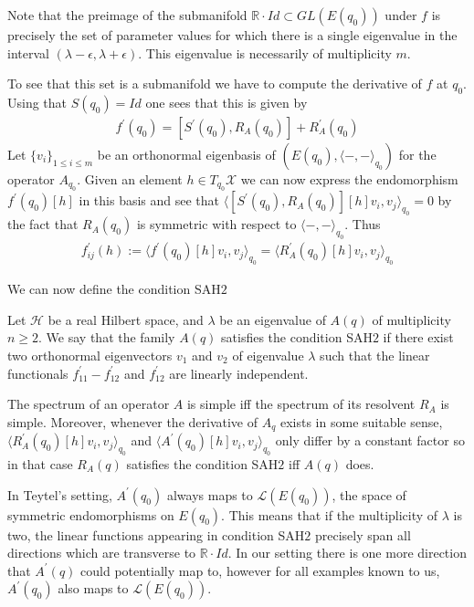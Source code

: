 Note that the preimage of the submanifold $\mathbb{R}\cdot Id\subset GL(E(q_0))$ under $f$ is precisely the set of parameter values for which there is a single eigenvalue in the interval $(\lambda-\epsilon,\lambda+\epsilon)$. This eigenvalue is necessarily of multiplicity $m$.\par
To see that this set is a submanifold we have to compute the derivative of $f$ at $q_0$. Using that $S(q_0)=Id$ one sees that this is given by
\begin{align*}
    f^{\prime}(q_0)=[S^{\prime}(q_0),R_{A}(q_0)]+R_{A}^{\prime}(q_0)
\end{align*}
Let $\{v_i\}_{1\leq i\leq m}$ be an orthonormal eigenbasis of $(E(q_0),\langle-,-\rangle_{q_0})$ for the operator $A_{q_0}$. Given an element $h\in T_{q_0}\mathcal{X}$ we can now express the endomorphism $f^{\prime}(q_0)[h]$ in this basis and see that $\langle [S^{\prime}(q_0),R_{A}(q_0)][h] v_i,v_j\rangle_{q_0}=0$ by the fact that $R_{A}(q_0)$ is symmetric with respect to $\langle-,-\rangle_{q_0}$. Thus
\begin{align*}
    f^\prime_{ij}(h):=\langle f^{\prime}(q_0)[h] v_i,v_j\rangle_{q_0}=\langle R_{A}^{\prime}(q_0)[h] v_i,v_j\rangle_{q_0}
\end{align*}


We can now define the condition SAH$2$

\begin{definition}{\cite{Teytel1999}}
\label{def: SAH2}
Let $\mathcal{H}$ be a real Hilbert space, and $\lambda$ be an eigenvalue of $A(q)$ of multiplicity $n\geq 2$. We say that the family $A(q)$ satisfies the condition SAH$2$ if there exist two orthonormal eigenvectors $v_1$ and $v_2$ of eigenvalue $\lambda$ such that the linear functionals $f^\prime_{11}-f^\prime_{12}$ and $f^\prime_{12}$ are linearly independent.
\end{definition}


\begin{rmk}
The spectrum of an operator $A$ is simple iff the spectrum of its resolvent $R_{A}$ is simple. Moreover, whenever the derivative of $A_q$ exists in some suitable sense, $\langle R_{A}^{\prime}(q_0)[h] v_i,v_j\rangle_{q_0}$ and $\langle A^{\prime}(q_0)[h] v_i,v_j\rangle_{q_0}$ only differ by a constant factor so in that case $R_{A}(q)$ satisfies the condition SAH$2$ iff $A(q)$ does. 
\end{rmk}

\begin{rmk}
  In Teytel's setting, $A^\prime (q_0)$ always maps to $\mathcal{L}(E(q_0))$, the space of symmetric endomorphisms on $E(q_0)$. This means that if the multiplicity of $\lambda$ is two, the linear functions appearing in condition SAH$2$ precisely span all directions which are transverse to $\mathbb{R}\cdot Id$. In our setting there is one more direction that $A^\prime(q)$ could potentially map to, however for all examples known to us, $A^\prime (q_0)$ also maps to $\mathcal{L}(E(q_0))$.
\end{rmk}



